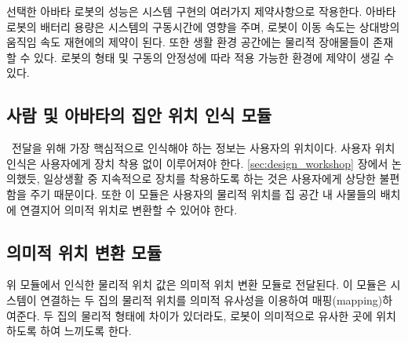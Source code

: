 선택한 아바타 로봇의 성능은 시스템 구현의 여러가지 제약사항으로 작용한다. 아바타 로봇의 배터리 용량은 시스템의 구동시간에 영향을 주며, 로봇이 이동 속도는 상대방의 움직임 속도 재현에의 제약이 된다. 또한 생활 환경 공간에는 물리적 장애물들이 존재할 수 있다. 로봇의 형태 및 구동의 안정성에 따라 적용 가능한 환경에 제약이 생길 수 있다.

\subsection{사람 및 아바타의 집안 위치 인식 모듈}
\sysname\이 \concept\ 전달을 위해 가장 핵심적으로 인식해야 하는 정보는 사용자의 위치이다. 사용자 위치 인식은 사용자에게 장치 착용 없이 이루어져야 한다. \ref{sec:design_workshop} 장에서 논의했듯, 일상생활 중 지속적으로 장치를 착용하도록 하는 것은 사용자에게 상당한 불편함을 주기 때문이다. 또한 이 모듈은 사용자의 물리적 위치를 집 공간 내 사물들의 배치에 연결지어 의미적 위치로 변환할 수 있어야 한다. 



\subsection{의미적 위치 변환 모듈}
위 모듈에서 인식한 물리적 위치 값은 의미적 위치 변환 모듈로 전달된다. 이 모듈은 시스템이 연결하는 두 집의 물리적 위치를 의미적 유사성을 이용하여 매핑(mapping)하여준다. 두 집의 물리적 형태에 차이가 있더라도, 로봇이 의미적으로 유사한 곳에 위치하도록 하여 \concept\을 느끼도록 한다. 


